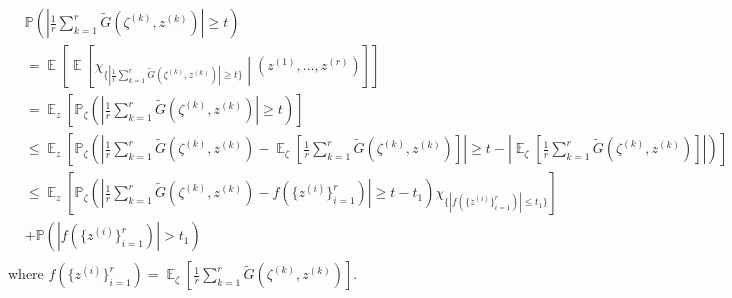 \documentclass[11pt]{article}
\newcommand{\<}{\langle}
\renewcommand{\>}{\rangle}
\newcommand{\E}{\operatorname{\mathbb{E}}}
\numberwithin{equation}{section}
\newcommand{\Prob}{\mathbb{P}}
\begin{document}
\begin{align*}
& \Prob \left( |\frac{1}{r}\sum_{k=1}^r \tilde{G}(\zeta^{(k)},z^{(k)})|\geq t \right) \\
&= \E \left[ \E \left[ \chi_{\{|\frac{1}{r}\sum_{k=1}^r \tilde{G}(\zeta^{(k)},z^{(k)})|\geq t \} } \middle| (z^{(1)},\ldots, z^{(r)} ) \right] \right]\\
&= \E_{z}\left[  \Prob_{\zeta}\left( \left|\frac{1}{r}\sum_{k=1}^r \tilde{G}(\zeta^{(k)}, z^{(k)} )\right|\geq t \right) \right]\\
&\leq \E_{z} \left[ \Prob_{\zeta} \left( \left| \frac{1}{r}\sum_{k=1}^r \tilde{G}(\zeta^{(k)}, z^{(k)} ) - \E_{\zeta} \left[ \frac{1}{r}\sum_{k=1}^r \tilde{G}(\zeta^{(k)}, z^{(k)} ) \right] \right| \geq t - \left|\E_{\zeta} \left[\frac{1}{r}\sum_{k=1}^r \tilde{G}(\zeta^{(k)}, z^{(k)} ) \right]\right| \right) \right]\\
&\leq \E_{z} \left[ \Prob_{\zeta} \left( \left| \frac{1}{r}\sum_{k=1}^r \tilde{G}(\zeta^{(k)}, z^{(k)} ) - f(\{z^{(i)}\}_{i=1}^{r})\right| \geq t - t_1  \right) \chi_{\{|f(\{z^{(i)}\}_{i=1}^{r})| \leq t_1\} } \right]\\
&+ \Prob(|f(\{z^{(i)}\}_{i=1}^{r})| > t_1)\\
\end{align*}
where $f(\{z^{(i)}\}_{i=1}^{r})=\E_{\zeta}\left[\frac{1}{r}\sum_{k=1}^{r}\tilde{G}(\zeta^{(k)},z^{(k)})\right]$.\\
\end{document}
